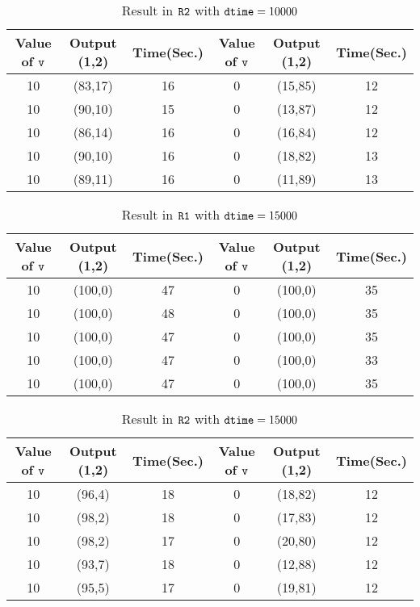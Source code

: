 \documentclass{report}
\newcommand{\co}[1]{$\cod{#1}$}
\begin{document}
\begin{table}[t]
\centering
\begin{tabular}{|ccc||ccc|}
\hline
{\bf Value of} \co{v}& {\bf Output} (1,2)& {\bf Time}({\bf Sec.}) & 
{\bf Value of} \co{v}& {\bf Output} (1,2)& {\bf Time}({\bf Sec.})\\ \hline
10 & (83,17) & 16  & 0 & (15,85) & 12 \\
10 & (90,10) & 15  & 0 & (13,87) & 12 \\
10 & (86,14) & 16  & 0 & (16,84) & 12 \\
10 & (90,10) & 16  & 0 & (18,82) & 13 \\
10 & (89,11) & 16  & 0 & (11,89) & 13 \\
\hline
\end{tabular}
\caption{Result in \co{R2} with $\mathtt{dtime} = 10000$}
\label{table:r2:10000}
\end{table}

\begin{table}[t]
\centering
\begin{tabular}{|ccc||ccc|}
\hline
{\bf Value of} \co{v}& {\bf Output} (1,2)& {\bf Time}({\bf Sec.}) & 
{\bf Value of} \co{v}& {\bf Output} (1,2)& {\bf Time}({\bf Sec.})\\ \hline
10 & (100,0) & 47  & 0 & (100,0) & 35 \\
10 & (100,0) & 48  & 0 & (100,0) & 35 \\
10 & (100,0) & 47  & 0 & (100,0) & 35 \\
10 & (100,0) & 47  & 0 & (100,0) & 33 \\
10 & (100,0) & 47  & 0 & (100,0) & 35 \\
\hline
\end{tabular}
\caption{Result in \co{R1} with $\mathtt{dtime} = 15000$}
\label{table:r1:15000}
\end{table}

\begin{table}[t]
\centering
\begin{tabular}{|ccc||ccc|}
\hline
{\bf Value of} \co{v}& {\bf Output} (1,2)& {\bf Time}({\bf Sec.}) & 
{\bf Value of} \co{v}& {\bf Output} (1,2)& {\bf Time}({\bf Sec.})\\ \hline
10 & (96,4) & 18  & 0 & (18,82) & 12 \\
10 & (98,2) & 18  & 0 & (17,83) & 12 \\
10 & (98,2) & 17  & 0 & (20,80) & 12 \\
10 & (93,7) & 18  & 0 & (12,88) & 12 \\
10 & (95,5) & 17  & 0 & (19,81) & 12 \\
\hline
\end{tabular}
\caption{Result in \co{R2} with $\mathtt{dtime} = 15000$}
\label{table:r2:15000}
\end{table}
\end{document}
